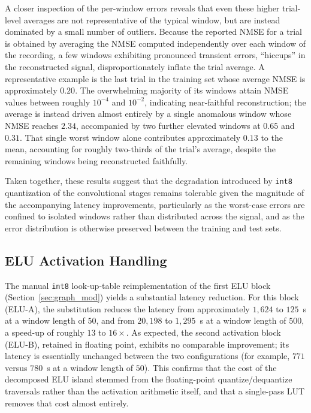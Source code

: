 \documentclass[12pt,DIV16,BCOR12mm,a4paper,footinclude=false,headinclude,parskip=half-,twoside,openright,cleardoublepage=empty,toc=index,bibliography=totoc,listof=totoc]{scrreprt}
\numberwithin{equation}{chapter}
\begin{document}
  A closer inspection of the per-window errors reveals that even these higher trial-level
  averages are not representative of the typical window, but are instead dominated by a
  small number of outliers. Because the reported NMSE for a trial is obtained by averaging
  the NMSE computed independently over each window of the recording, a few windows
  exhibiting pronounced transient errors, ``hiccups'' in the reconstructed
  signal, disproportionately inflate the trial average. A representative example is the last
  trial in the training set whose average NMSE is approximately $0.20$. The overwhelming
  majority of its windows attain NMSE values between roughly $10^{-4}$ and $10^{-2}$,
  indicating near-faithful reconstruction; the average is instead driven almost entirely
  by a single anomalous window whose NMSE reaches $2.34$, accompanied by two further
  elevated windows at $0.65$ and $0.31$. That single worst window alone contributes
  approximately $0.13$ to the mean, accounting for roughly two-thirds of the trial's
  average, despite the remaining windows being reconstructed faithfully.

  Taken together, these results suggest that the degradation introduced by \texttt{int8}
  quantization of the convolutional stages remains tolerable given the magnitude of the
  accompanying latency improvements, particularly as the worst-case errors are confined to
  isolated windows rather than distributed across the signal, and as the error
  distribution is otherwise preserved between the training and test sets.

  \subsection{ELU Activation Handling}

  The manual \texttt{int8} look-up-table reimplementation of the first ELU block
  (Section~\ref{sec:graph_mod}) yields a substantial latency reduction. For this block (ELU-A),
  the substitution reduces the latency from approximately $1{,}624$ to $125$~\textmu s at
  a window length of $50$, and from $20{,}198$ to $1{,}295$~\textmu s at a window length
  of $500$, a speed-up of roughly $13$ to $16\times$. As expected, the second activation
  block (ELU-B), retained in floating point, exhibits no comparable improvement; its
  latency is essentially unchanged between the two configurations (for example, $771$
  versus $780$~\textmu s at a window length of $50$). This confirms that the cost of the
  decomposed ELU island stemmed from the floating-point quantize/dequantize traversals
  rather than the activation arithmetic itself, and that a single-pass LUT removes that
  cost almost entirely.
\end{document}
